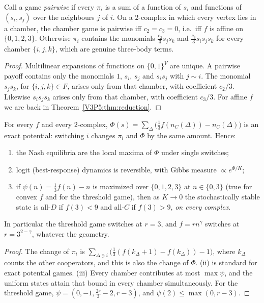 \begin{theorem}[Irreducibility]\label{V3P5:thm:irreducible}
Call a game \emph{pairwise} if every $\pi_i$ is a sum of a function of $s_i$ and functions of
$(s_i,s_j)$ over the neighbours $j$ of $i$. On a $2$-complex in which every vertex lies in a
chamber, the chamber game is pairwise iff $c_2=c_3=0$, i.e.\ iff $f$ is affine on
$\{0,1,2,3\}$. Otherwise $\pi_i$ contains the monomials $\frac{c_2}3s_js_k$ and
$\frac{c_3}3s_is_js_k$ for every chamber $\{i,j,k\}$, which are genuine three-body terms.
\end{theorem}

\begin{proof}
Multilinear expansions of functions on $\{0,1\}^{V}$ are unique. A pairwise payoff contains only
the monomials $1$, $s_i$, $s_j$ and $s_is_j$ with $j\sim i$. The monomial $s_js_k$, for
$\{i,j,k\}\in F$, arises only from that chamber, with coefficient $c_2/3$. Likewise
$s_is_js_k$ arises only from that chamber, with coefficient $c_3/3$. For affine $f$ we are back in
Theorem~\ref{V3P5:thm:reduction}.
\end{proof}

\begin{theorem}\label{V3P5:thm:potential}
For every $f$ and every $2$-complex, $\Phi(s)=\sum_{\Delta}\bigl(\frac13f(n_C(\Delta))-n_C(\Delta)\bigr)$
is an exact potential: switching $i$ changes $\pi_i$ and $\Phi$ by the same amount. Hence:
\begin{enumerate}
\item[(i)] the Nash equilibria are the local maxima of $\Phi$ under single switches;
\item[(ii)] logit (best-response) dynamics is reversible, with Gibbs measure $\propto e^{\Phi/K}$;
\item[(iii)] if $\psi(n)=\frac13f(n)-n$ is maximized over $\{0,1,2,3\}$ at $n\in\{0,3\}$ (true for
convex $f$ and for the threshold game), then as $K\to0$ the stochastically stable state is all-$D$
if $f(3)<9$ and all-$C$ if $f(3)>9$, \emph{on every complex}.
\end{enumerate}
In particular the threshold game switches at $r=3$, and $f=rn^{\gamma}$ switches at $r=3^{2-\gamma}$,
whatever the geometry.
\end{theorem}

\begin{proof}
The change of $\pi_i$ is $\sum_{\Delta\ni i}\bigl(\frac13(f(k_\Delta+1)-f(k_\Delta))-1\bigr)$, where
$k_\Delta$ counts the other cooperators, and this is also the change of $\Phi$. (ii) is standard
for exact potential games. (iii) Every chamber contributes at most $\max\psi$, and the uniform
states attain that bound in every chamber simultaneously. For the threshold game,
$\psi=(0,-1,\frac{2r}3-2,r-3)$, and $\psi(2)\le\max(0,r-3)$.
\end{proof}


